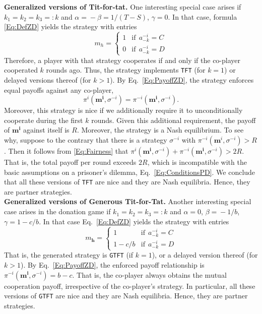 \documentclass[11pt]{article}
\theoremstyle{plainCl1}
\theoremstyle{plainCl2}
\def\tft{\texttt{TFT}}
\def\gtft{\texttt{GTFT}}
\begin{document}
\noindent
{\bf Generalized versions of Tit-for-tat.} 
One interesting special case arises if $k_1\!=\!k_2\!=\!k_3\!=:\!k$ and $\alpha
\!=\! -\beta \!=\!1/(T\!-\!S)$, $\gamma \!=\! 0$. In that case, formula
\eqref{Eq:DefZD} yields the strategy with entries
\begin{equation*}
m_h = \left\{
\begin{array}{ll}
1	&\text{if}~~a^{-i}_{-k}=C\\[0.2cm]
0	&\text{if}~~a^{-i}_{-k}=D
\end{array}
\right.
\end{equation*}
Therefore, a player with that strategy cooperates if and only if the co-player cooperated $k$ rounds ago. 
Thus, the strategy implements \tft{} (for $k\!=\!1$) or delayed versions thereof (for $k\!>\!1$). 
By Eq.~\eqref{Eq:PayoffZD}, the strategy enforces equal payoffs against any co-player, 
\begin{equation} \label{Eq:Fairness}
\pi^i(\mathbf{m^i},\sigma^{-i}) \!=\! \pi^{-i}(\mathbf{m^i},\sigma^{-i}).
\end{equation} 
Moreover, this strategy is nice if we additionally require it to unconditionally cooperate during the first $k$ rounds. 
Given this additional requirement, the payoff of $\mathbf{m^i}$ against itself is $R$. 
Moreover, the strategy is a Nash equilibrium. To see why, suppose to the contrary that there is a strategy $\sigma^{-i}$ with $\pi^{-i}(\mathbf{m}^i,\sigma^{-i}) \!>\! R$. Then it follows from \eqref{Eq:Fairness} that $\pi^i(\mathbf{m^i},\sigma^{-i}) \!+\! \pi^{-i}(\mathbf{m^i},\sigma^{-i})\!>\!2R$. That is, the total  payoff per round exceeds $2R$, which is incompatible with the basic assumptions on a prisoner's dilemma, Eq.~\eqref{Eq:ConditionsPD}. We conclude that all these versions of \tft{} are nice and they are Nash equilibria. Hence, they are partner strategies.\\

\noindent
{\bf Generalized versions of Generous Tit-for-Tat.}
Another interesting special case arises in the donation game if $k_1\!=\!k_2\!=\!k_3\!=:\!k$ and
$\alpha\!=\!0$, $\beta\!=\!-1/b$, $\gamma\!=\!1\!-\!c/b$. In that case
Eq.~\eqref{Eq:DefZD} yields the strategy with entries
\begin{equation*}
m_\mathbf{h} = \left\{
\begin{array}{ll}
1	&\text{if}~~a^{-i}_{-k}=C\\[0.2cm]
1-c/b	&\text{if}~~a^{-i}_{-k}=D
\end{array}
\right.
\end{equation*}
That is, the generated strategy is \gtft{} (if $k\!=\!1$), or a delayed version
thereof (for $k\!>\!1$). By Eq.~\eqref{Eq:PayoffZD}, the enforced payoff
relationship is $\pi^{-i}(\mathbf{m^{i}}, \sigma^{-i})\!=\!b\!-\!c$. 
That is, the co-player always obtains the mutual cooperation payoff, irrespective of the co-player's strategy. 
In particular, all these versions of \gtft{} are nice and they are Nash equilibria. 
Hence, they are partner strategies.
\end{document}

